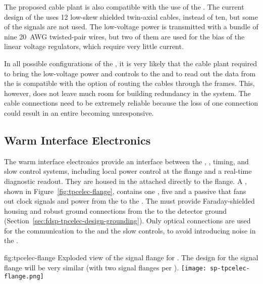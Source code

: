 The proposed cable plant is also compatible with the use of the 
. The current design of the   uses 
\num{12} low-skew shielded twin-axial cables, instead of ten, but some of
the signals are not used. The low-voltage power is transmitted with a 
bundle of nine \SI{20}{AWG} twisted-pair wires, but two of them are
used for the bias of the linear voltage regulators, which require very
little current.

In all possible configurations of the , it is very likely that
the cable plant required to bring the low-voltage power and controls
to the  and to read out the data from the  is
compatible with the option of routing the cables through the 
frames. This, however, does not leave much room for building redundancy in
the system. The cable connections need to be extremely reliable because
the loss of one connection could result in an entire  becoming
unresponsive.

\subsection{Warm Interface Electronics}
\label{sec:fdsp-tpcelec-design-warm}

The warm interface electronics provide an interface between the 
, , timing, and slow control systems, including 
local power control at the flange and a real-time diagnostic readout. 
They are housed in the  attached directly to the  
flange.  %
A , shown in Figure~\ref{fig:tpcelec-flange}, 
contains one , %
 five %
 and a passive 
that fans out clock signals and  power from the  to the 
. The  must provide Faraday-shielded housing and 
robust ground connections from the  to the detector ground 
(Section~\ref{sec:fdsp-tpcelec-design-grounding}). Only optical
connections are used for the communication to the  and the
slow controls, to avoid introducing noise in the  \fdth.

\begin{dunefigure}
{fig:tpcelec-flange}
{Exploded view of the  signal flange for .  
The design for the    
signal flange will be very similar (with two  signal flanges per \fdth).}
\texttt{[image: sp-tpcelec-flange.png]}
\end{dunefigure}


